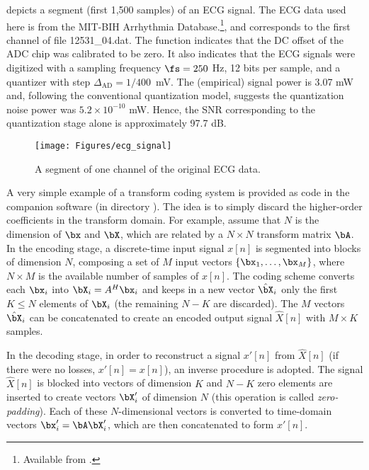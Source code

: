  depicts a segment (first 1,500 samples) of an ECG signal. The ECG data used here is from the MIT-BIH Arrhythmia Database.\footnote{Available from .}, and  corresponds to the first channel of file 12531\_04.dat. The function  indicates that the DC offset of the ADC chip was calibrated to be zero. It also indicates that the ECG signals were digitized with a sampling frequency $\fs=250$ Hz, 12 bits per sample, and a quantizer with step $\Delta_{\textrm{AD}} = 1/400$~mV. The (empirical) signal power is 3.07 mW and, following the conventional quantization model,  suggests the quantization noise power was $5.2 \times 10^{-10}$ mW. Hence, the SNR corresponding to the quantization stage alone is approximately 97.7 dB.

\begin{figure}[!htb]
        \centering
                \texttt{[image: Figures/ecg\_signal]}          
        \caption{A segment of one channel of the original ECG data.\label{fig:ecg_signal}}
\end{figure}

A very simple example of a transform coding system is provided as {\matlab} code in the companion software (in directory ). The idea is to simply discard the higher-order coefficients in the transform domain. For example, assume that $N$ is the dimension of $\bx$ and $\bX$, which are related by a $N \times N$ transform matrix $\bA$. In the encoding stage, a discrete-time input signal $x[n]$ is segmented into blocks of dimension $N$, composing a set of $M$ input vectors $\{\bx_1,\ldots,\bx_M\}$, where $N \times M$ is the available number of samples of $x[n]$. The coding scheme converts each $\bx_i$ into $\bX_i = A^H \bx_i$ and keeps in a new vector $\hat \bX_i$ only the first $K \le N$ elements of $\bX_i$ (the remaining $N-K$ are discarded). The $M$ vectors $\hat \bX_i$ can be concatenated to create an encoded output signal $\hat X[n]$ with $M \times K$ samples.

In the decoding stage, in order to reconstruct a signal $x'[n]$ from $\hat X[n]$ (if there were no losses, $x'[n]=x[n]$), an inverse procedure is adopted. The signal $\hat X[n]$ is blocked into vectors of dimension $K$ and $N-K$ zero elements are inserted to create vectors $\bX'_i$ of dimension $N$ (this operation is called \emph{zero-padding}). Each of these $N$-dimensional vectors is converted to time-domain vectors $\bx'_i = \bA \bX'_i$, which are then concatenated to form $x'[n]$.

